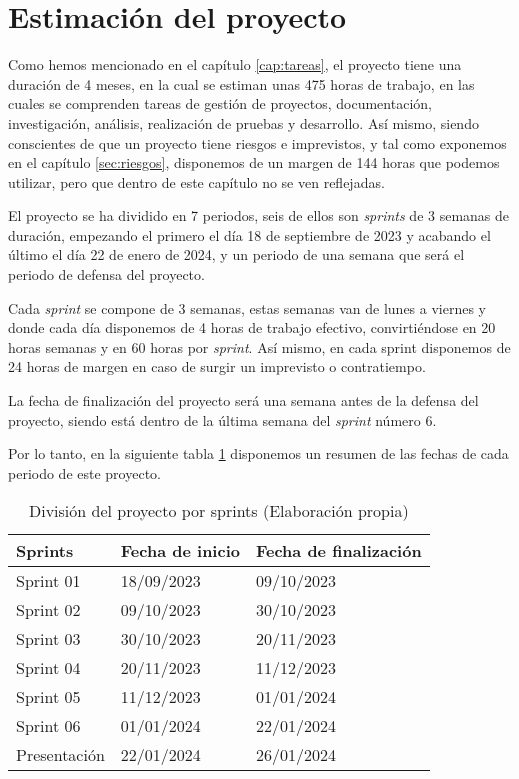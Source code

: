 \section{Estimación del proyecto}
\label{sec:estimacion}


Como hemos mencionado en el capítulo \ref{cap:tareas}, el proyecto tiene una duración de 4 meses, en la cual se estiman unas 475 horas de trabajo, en las cuales se
comprenden tareas de gestión de proyectos, documentación, investigación, análisis, realización de pruebas y desarrollo. Así mismo, siendo conscientes de que un proyecto
tiene riesgos e imprevistos, y tal como exponemos en el capítulo \ref{sec:riesgos}, disponemos de un margen de 144 horas que podemos utilizar, pero que dentro de este
capítulo no se ven reflejadas.

El proyecto se ha dividido en 7 periodos, seis de ellos son \textit{sprints} de 3 semanas de duración, empezando el primero el día 18 de septiembre de 2023 y acabando el último
el día 22 de enero de 2024, y un periodo de una semana que será el periodo de defensa del proyecto.

Cada \textit{sprint} se compone de 3 semanas, estas semanas van de lunes a viernes y donde cada día disponemos de 4 horas de trabajo efectivo, convirtiéndose en 20 horas semanas
y en 60 horas por \textit{sprint}. Así mismo, en cada sprint disponemos de 24 horas de margen en caso de surgir un imprevisto o contratiempo.

La fecha de finalización del proyecto será una semana antes de la defensa del proyecto, siendo está dentro de la última semana del \textit{sprint} número 6.

Por lo tanto, en la siguiente tabla \ref{tab:proyecto_estimacion} disponemos un resumen de las fechas de cada periodo de este proyecto.

\begin{table}[H]
    \centering
    \begin{tabular}{|l|l|l|}
    \hline
    \rowcolor[HTML]{8EA9D8} 
    Sprints      & Fecha de inicio & Fecha de finalización \\ \hline
    Sprint 01    & 18/09/2023      & 09/10/2023            \\ \hline
    Sprint 02    & 09/10/2023      & 30/10/2023            \\ \hline
    Sprint 03    & 30/10/2023      & 20/11/2023            \\ \hline
    Sprint 04    & 20/11/2023      & 11/12/2023            \\ \hline
    Sprint 05    & 11/12/2023      & 01/01/2024            \\ \hline
    Sprint 06    & 01/01/2024      & 22/01/2024            \\ \hline
    Presentación & 22/01/2024      & 26/01/2024            \\ \hline
    \end{tabular}
    \caption[División del proyecto por sprints]{División del proyecto por sprints (Elaboración propia)}
    \label{tab:proyecto_estimacion}
\end{table}

